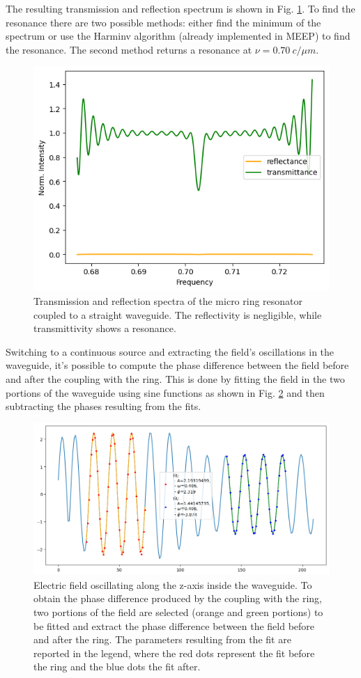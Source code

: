 The resulting transmission and reflection spectrum is shown in Fig. \ref{fig:ring_spectrum}. To find the resonance there are two possible methods: either find the minimum of the spectrum or use the Harminv algorithm (already implemented in MEEP) to find the resonance. The second method returns a resonance at \(\nu = 0.70\ c/\mu m\).

\begin{figure}[H]
    \centering
    \includegraphics[width=0.8\linewidth]{Figures/ring_spectrum.png}
    \caption{Transmission and reflection spectra of the micro ring resonator coupled to a straight waveguide. The reflectivity is negligible, while transmittivity shows a resonance.}
    \label{fig:ring_spectrum}
\end{figure}

Switching to a continuous source and extracting the field's oscillations in the waveguide, it's possible to compute the phase difference between the field before and after the coupling with the ring. This is done by fitting the field in the two portions of the waveguide using sine functions as shown in Fig. \ref{fig:ring_phase_delay} and then subtracting the phases resulting from the fits.

\begin{figure}[H]
    \centering
    \includegraphics[width=0.8\linewidth]{Figures/ring_phase_delay.png}
    \caption{Electric field oscillating along the z-axis inside the waveguide. To obtain the phase difference produced by the coupling with the ring, two portions of the field are selected (orange and green portions) to be fitted and extract the phase difference between the field before and after the ring. The parameters resulting from the fit are reported in the legend, where the red dots represent the fit before the ring and the blue dots the fit after.}
    \label{fig:ring_phase_delay}
\end{figure}


